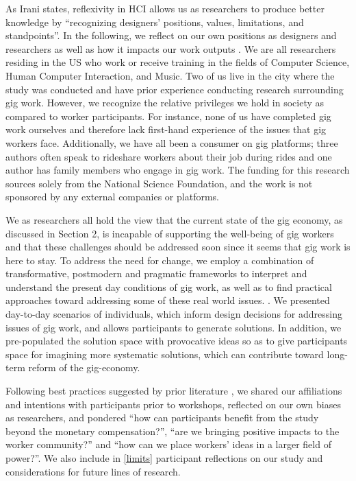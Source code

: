 As Irani states, reflexivity in HCI allows us as researchers to produce better knowledge by ``recognizing designers' positions, values, limitations, and standpoints''. In the following, we reflect on our own positions as designers and researchers as well as how it impacts our work outputs \cite{irani2016stories}. We are all researchers residing in the US who work or receive training in the fields of Computer Science, Human Computer Interaction, and Music. Two of us live in the city where the study was conducted and have prior experience conducting research surrounding gig work. However, we recognize the relative privileges we hold in society as compared to worker participants. For instance, none of us have completed gig work ourselves and therefore lack first-hand experience of the issues that gig workers face. Additionally, we have all been a consumer on gig platforms; three authors often speak to rideshare workers about their job during rides and one author has family members who engage in gig work. The funding for this research sources solely from the National Science Foundation, and the work is not sponsored by any external companies or platforms.

We as researchers all hold the view that the current state of the gig economy, as discussed in Section 2, is incapable of supporting the well-being of gig workers and that these challenges should be addressed soon since it seems that gig work is here to stay. To address the need for change, we employ a combination of transformative, postmodern and pragmatic frameworks to interpret and understand the present day conditions of gig work, as well as to find practical approaches toward addressing some of these real world issues. \cite{Creswell2016-rq}. We presented day-to-day scenarios of individuals, which inform design decisions for addressing issues of gig work, and allows participants to generate solutions. In addition, we pre-populated the solution space with provocative ideas so as to give participants space for imagining more systematic solutions, which can contribute toward long-term reform of the gig-economy. 

Following best practices suggested by prior literature \cite{reinharz1992feminist, calvin, liang2021embracing}, we shared our affiliations and intentions with participants prior to workshops, reflected on our own biases as researchers, and pondered ``how can participants benefit from the study beyond the monetary compensation?'', ``are we bringing positive impacts to the worker community?'' and ``how can we place workers' ideas in a larger field of power?''.
We also include in \ref{limits} participant reflections on our study and considerations for future lines of research.

